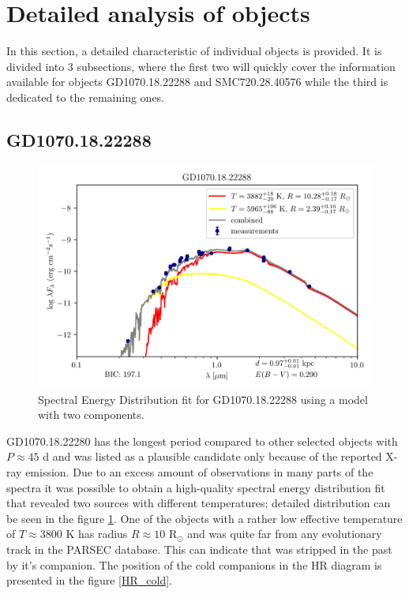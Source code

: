 \documentclass{pracalicmgr}
\begin{document}
\section{Detailed analysis of objects}
In this section, a detailed characteristic of individual objects is provided. It is divided into $3$ subsections, where the first two will quickly cover the information
available for objects GD1070.18.22288 and SMC720.28.40576 while the third is dedicated to the remaining ones.
\subsection{GD1070.18.22288}
\begin{figure}[H]
    \includegraphics{plots/GD1070.18.22288/GD1070.18.22288_double_emcee.png}
    \caption{Spectral Energy Distribution fit for GD1070.18.22288 using a model with two components.}\label{GD1070SED}
\end{figure}
GD1070.18.22280 has the longest period compared to other selected objects with $P\approx 45$ d and was listed as a plausible candidate only because of the reported X-ray emission.
Due to an excess amount of observations in many parts of the spectra it was possible to obtain a high-quality spectral energy distribution fit that revealed two sources with different temperatures;
detailed distribution can be seen in the figure \ref{GD1070SED}.
One of the objects with a rather low effective temperature of
$T\approx 3800$ K has radius $R\approx 10$ $\textrm{R}_{\odot}$ and was quite far from any evolutionary track in the PARSEC database. This can indicate
that was stripped in the past by it's companion.
The position of the cold companions in the HR diagram is presented in the figure \ref{HR_cold}.
\end{document}

